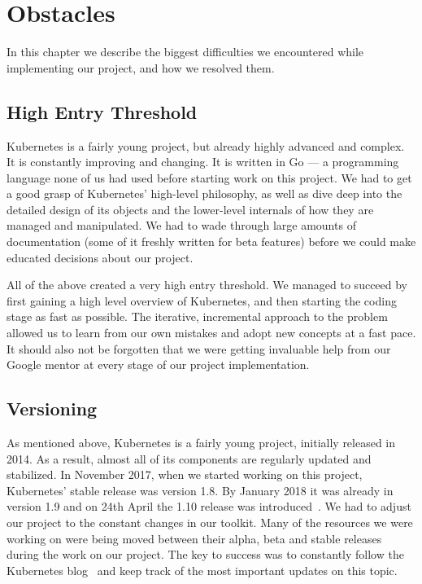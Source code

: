 \chapter{Obstacles}
In this chapter we describe the biggest difficulties we encountered while implementing our project,
and how we resolved them.

\section{High Entry Threshold}
Kubernetes is a fairly young project, but already highly advanced and complex. It is constantly
improving and changing. It is written in Go --- a programming language none of
us had used before starting work on this project. We had to get a good grasp of Kubernetes’
high-level philosophy, as well as dive deep into the detailed design of its objects and the
lower-level internals of how they are managed and manipulated. We had to wade through large amounts
of documentation (some of it freshly written for beta features) before we could make educated
decisions about our project.

All of the above created a very high entry threshold. We managed to succeed by
first gaining a high level overview of Kubernetes, and then starting the coding stage as fast as
possible. The iterative, incremental approach to the problem allowed us to learn from our own mistakes
and adopt new concepts at a fast pace. It should also not be forgotten that we were getting
invaluable help from our Google mentor at every stage of our project implementation.

\section{Versioning}
As mentioned above, Kubernetes is a fairly young project, initially released in 2014. As a result,
almost all of its components are regularly updated and stabilized. In November 2017, when we
started working on this project, Kubernetes' stable release was version 1.8. By January 2018 it was
already in version 1.9 and on 24th April the 1.10 release was introduced~\cite{releases}. We had to adjust our
project to the constant changes in our toolkit. Many of the resources we were working on were
being moved between their alpha, beta and stable releases during the work on our project. The key to
success was to constantly follow the Kubernetes blog~\cite{blog} and keep track of the most important updates
on this topic.

